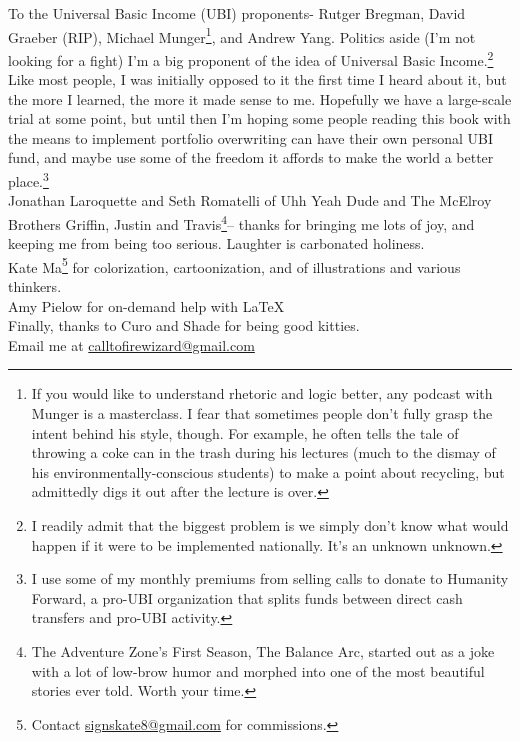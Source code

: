 To the Universal Basic Income (UBI) proponents- Rutger Bregman, David Graeber (RIP), Michael Munger\footnote{If you would like to understand rhetoric and logic better, any podcast with Munger is a masterclass. I fear that sometimes people don't fully grasp the intent behind his style, though. For example, he often tells the tale of throwing a coke can in the trash during his lectures (much to the dismay of his environmentally-conscious students) to make a point about recycling, but admittedly digs it out after the lecture is over.}, and Andrew Yang. Politics aside (I'm not looking for a fight) I'm a big proponent of the idea of Universal Basic Income.\footnote{I readily admit that the biggest problem is we simply don't know what would happen if it were to be implemented nationally. It's an unknown unknown.} Like most people, I was initially opposed to it the first time I heard about it, but the more I learned, the more it made sense to me. Hopefully we have a large-scale trial at some point, but until then I'm hoping some people reading this book with the means to implement portfolio overwriting can have their own personal UBI fund, and maybe use some of the freedom it affords to make the world a better place.\footnote{I use some of my monthly premiums from selling calls to donate to Humanity Forward, a pro-UBI organization that splits funds between direct cash transfers and pro-UBI activity.}\\

Jonathan Laroquette and Seth Romatelli of Uhh Yeah Dude and The McElroy Brothers Griffin, Justin and Travis\footnote{The Adventure Zone's First Season, The Balance Arc, started out as a joke with a lot of low-brow humor and morphed into one of the most beautiful stories ever told. Worth your time.}-- thanks for bringing me lots of joy, and keeping me from being too serious. Laughter is carbonated holiness.\\ 

Kate Ma\footnote{Contact \url{signskate8@gmail.com} for commissions.} for colorization, cartoonization, and of illustrations and various thinkers.\\

Amy Pielow for on-demand help with \LaTeX\\

Finally, thanks to Curo and Shade for being good kitties.\\

Email me at \url{calltofirewizard@gmail.com}